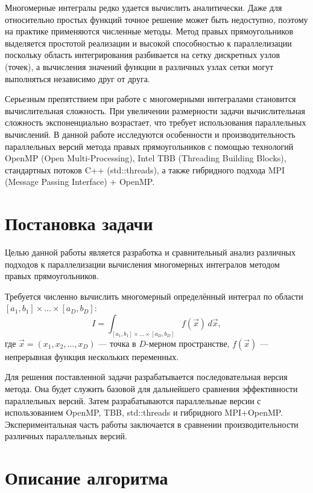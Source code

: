 \documentclass[a4paper,12pt]{article}
\begin{document}
  Многомерные интегралы редко удается вычислить аналитически.
  Даже для относительно простых функций точное решение может быть недоступно, поэтому на практике применяются численные методы.
  Метод правых прямоугольников выделяется простотой реализации и высокой способностью к параллелизации поскольку область интегрирования разбивается на сетку дискретных узлов (точек), а вычисления значений функции в различных узлах сетки могут выполняться независимо друг от друга.

  Серьезным препятствием при работе с многомерными интегралами становится вычислительная сложность.
  При увеличении размерности задачи вычислительная сложность экспоненциально возрастает, что требует использования параллельных вычислений.
  В данной работе исследуются особенности и производительность параллельных версий метода правых прямоугольников с помощью технологий OpenMP (Open Multi-Processing), Intel TBB (Threading Building Blocks), стандартных потоков C++ (std::threads), а также гибридного подхода MPI (Message Passing Interface) + OpenMP\@.

  \newpage


  \section{Постановка задачи}\label{sec:problem}

  Целью данной работы является разработка и сравнительный анализ различных подходов к параллелизации вычисления многомерных интегралов методом правых прямоугольников.

  Требуется численно вычислить многомерный определённый интеграл по области $[a_1,b_1] \times \ldots \times [a_D,b_D]$:
  \[
    I = \int_{[a_1,b_1] \times \ldots \times [a_D,b_D]} f(\vec{x}) \, d\vec{x},
  \]
  где $\vec{x} = (x_1, x_2, \ldots, x_D)$ — точка в $D$-мерном пространстве, $f(\vec{x})$ — непрерывная функция нескольких переменных.

  Для решения поставленной задачи разрабатывается последовательная версия метода.
  Она будет служить базовой для дальнейшего сравнения эффективности параллельных версий.
  Затем разрабатываются параллельные версии с использованием OpenMP, TBB, std::threads и гибридного MPI+OpenMP\@.
  Экспериментальная часть работы заключается в сравнении производительности различных параллельных версий.

  \newpage


  \section{Описание алгоритма}\label{sec:algorithm}
\end{document}
